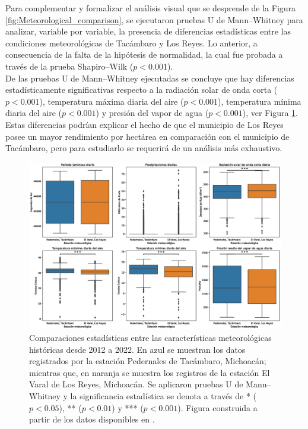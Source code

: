 Para complementar y formalizar el análisis visual que se desprende de la Figura \ref{fig:Meteorological_comparison}, se ejecutaron pruebas U de Mann--Whitney para analizar, variable por variable, la presencia de diferencias estadísticas entre las condiciones meteorológicas de Tacámbaro y Los Reyes. Lo anterior, a consecuencia de la falta de la hipótesis de normalidad, la cual fue probada a través de la prueba Shapiro--Wilk ($p<0.001$).\\


De las pruebas U de Mann--Whitney ejecutadas se concluye que hay diferencias estadísticamente significativas respecto a la radiación solar de onda corta ($p < 0.001$), temperatura máxima diaria del aire ($p < 0.001$), temperatura mínima diaria del aire ($p < 0.001$) y presión del vapor de agua ($p < 0.001$), ver Figura \ref{fig:Meteorological_statistical_comparison}. Estas diferencias podrían explicar el hecho de que el municipio de Los Reyes posee un mayor rendimiento por hectárea en comparación con el municipio de Tacámbaro, pero para estudiarlo se requerirá de un análisis más exhaustivo.\\

\begin{figure}[!ht]
    \centering
    \includegraphics[width=1\linewidth]{Images/Meteorological_statistical_comparison.eps}
    \caption{Comparaciones estadísticas entre las características meteorológicas históricas desde 2012 a 2022. En azul se muestran los datos registrados por la estación Pedernales de Tacámbaro, Michoacán; mientras que, en naranja se muestra los registros de la estación El Varal de Los Reyes, Michoacán. Se aplicaron pruebas U de Mann--Whitney y la significancia estadística se denota a través de * ($p<0.05$), ** ($p<0.01$) y *** ($p<0.001$). Figura construida a partir de los datos disponibles en \cite{Rodriguez-Moreno_2021}.}
    \label{fig:Meteorological_statistical_comparison}
\end{figure}


